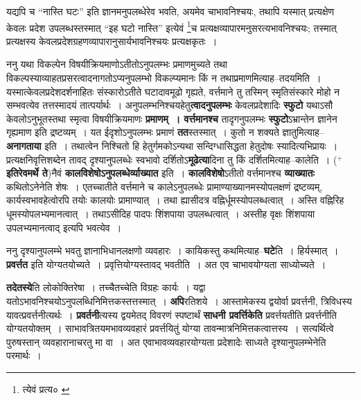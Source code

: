 \documentclass[article,12pt,a4paper]{memoir}
\newcommand{\add}[1]{($^{+}$#1)}
\begin{document}
	  \pstart यद्यपि च “नास्ति घटः” इति ज्ञानमनुपलब्धेरेव भवति, अयमेव चाभावनिश्चयः, तथापि यस्मात् प्रत्यक्षेण केवलः प्रदेश उपलब्धस्तस्मात् “इह घटो नास्ति” इत्येवं \footnote{त्येवं प्रत्य० \cite{dp-msC}}\-च प्रत्यक्षव्यापारमनुसरत्यभावनिश्चयः; तस्मात् प्रत्यक्षस्य केवलप्रदेशग्रहणव्यापारानुसार्यभावनिश्चयः प्रत्यक्षकृतः ।
	\pend
      
	  \endgroup
	

	  \pstart ननु यथा विकल्पेन विषयीक्रियमाणोऽतीतोऽनुपलम्भः प्रमाणमुच्यते तथा विकल्पस्याव्याहतप्रसरत्वादनागतोऽप्यनुपलम्भो विकल्प्यमानः किं न तथाप्रमाणमित्याह--तदयमिति । यस्मात्केवलप्रदेशदर्शनाहितः संस्कारोऽतीते घटादावमूढो गृह्यते, वर्त्तमाने तु तस्मिन् स्मृतिसंस्कारे मोहो न सम्भवत्येव तत्तस्मादयं तात्पर्यार्थः । अनुपलम्भनिश्चयहेतु\textbf{त्वादनुपलम्भः} केवलप्रदेशादिः \textbf{स्फुटो} यथाऽसौ केवलोऽनुभूतस्तथा स्मृत्वा विषयीक्रियमाणः \textbf{प्रमाणम् । वर्त्तमानश्च} तादृगनुपलम्भः \textbf{स्फुटो}ऽभ्रान्तेन ज्ञानेन गृह्यमाण इति द्रष्टव्यम् । यत ईदृशोऽनुपलम्भः प्रमाणं \textbf{तत}स्तस्मात् । कुतो न शक्यते ज्ञातुमित्याह--\textbf{अनागताया} इति । तथात्वेन निश्चितो हि हेतुर्गमकोऽन्यथा सन्दिग्धासिद्धता हेतुदोषः स्यादित्यभिप्रायः । प्रत्यक्षनिवृत्तिशब्देन तावद् दृश्यानुपलब्धेः स्वभावो दर्शितोऽ\textbf{मूढेत्या}दिना तु किं दर्शितमित्याह--कालेति । \add{\textbf{इतिरेवमर्थे ते}}नैवं \textbf{कालविशेषोऽनुपलब्धेर्व्याख्यात} इति । \textbf{कालविशेषो}ऽतीतो वर्त्तमानश्च \textbf{व्याख्यातः} कथितोऽनेनेति शेषः । एतच्चातीते वर्त्तमाने च कालेऽनुपलब्धेः प्रामाण्याख्यानमस्योपलक्षणं द्रष्टव्यम्, कार्यस्वभावहेत्वोरपि तयोः कालयोः प्रामाण्यात् । तथा ह्यासीदत्र वह्निर्धूमस्योपलब्धत्वात् । अस्ति वह्निरिह धूमस्योपलभ्यमानत्वात् । तथाऽसीदिह पादपः शिंशपाया उपलब्धत्वात् । अस्तीह वृक्षः शिंशपाया उपलभ्यमानत्वाद् इत्यपि भवत्येव ।
	\pend
      

	  \pstart ननु दृश्यानुपलम्भे भवतु ज्ञानाभिधानलक्षणो व्यवहारः । कायिकस्तु कथमित्याह--\textbf{घटे}ति । हिर्यस्मात् । \textbf{प्रवर्त्तत} इति योग्यतयोच्यते । प्रवृत्तियोग्यस्तावद् भवतीति । अत एव चाभावयोग्यता साध्योच्यते ।
	\pend
      

	  \pstart \textbf{तदेतस्ये}ति लोकोक्तिरेषा । तच्चैतच्चेति विग्रहः कार्यः । यद्वा यतोऽभावनिश्चयोऽनुपलब्धिनिमित्तकस्तत्तस्मात् । \textbf{अपि}रतिशये । आस्तामेकस्य द्वयोर्वा प्रवर्त्तनी, त्रिविधस्य यावत्प्रवर्त्तनीत्यर्थः । \textbf{प्रवर्तनी}त्यस्य द्वयमेतद् विवरणं स्पष्टार्थं \textbf{साधनी प्रवर्त्तिके}\leavevmode{}\textbf{ति} प्रवर्त्तयतीति प्रवर्त्तनीति योग्यतयोक्तम् । साभावत्रितयमभावव्यवहारं प्रवर्त्तयितुं योग्या तावन्मात्रनिमित्तकत्वात्तस्य । सत्यर्थित्वे पुरुषस्तान् व्यवहारानाचरतु मा वा । अत एवाभावव्यवहारयोग्यता प्रदेशादेः साध्यते दृश्यानुपलम्भेनेति परमार्थः ।
	\pend
	  \bigskip
	  \begingroup
	
\end{document}
